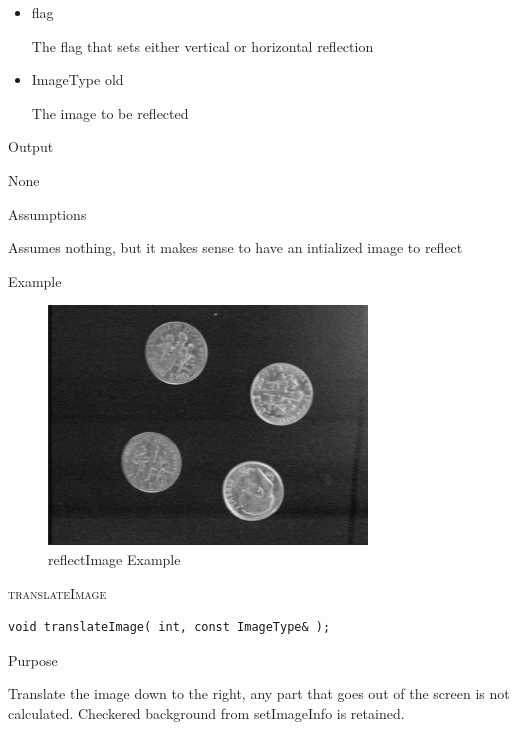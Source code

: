 \documentclass[pdftex, 11pt]{article}
\begin{document}
\begin{description}
\begin{description}
				\begin{itemize}

					\item{flag}

						The flag that sets either vertical or
						horizontal reflection

					\item{ImageType old}

						The image to be reflected

				\end{itemize}

			\item{Output}

				None

			\item{Assumptions}

				Assumes nothing, but it makes sense to have an intialized
				image to reflect

			\item{Example}

				\begin{figure}[h]
					\centering
					\caption{reflectImage Example}
				\includegraphics{images/outreflect.png}
			\end{figure}

		\end{description}


	\item{\textsc{translateImage}}
		\begin{description}

\begin{lstlisting}
void translateImage( int, const ImageType& );
\end{lstlisting}

			\item{Purpose}

				Translate the image down to the right,
				any part that goes out of the screen is
 				not calculated.  Checkered background from
				setImageInfo is retained.


\end{description}
\end{description}
\end{document}

